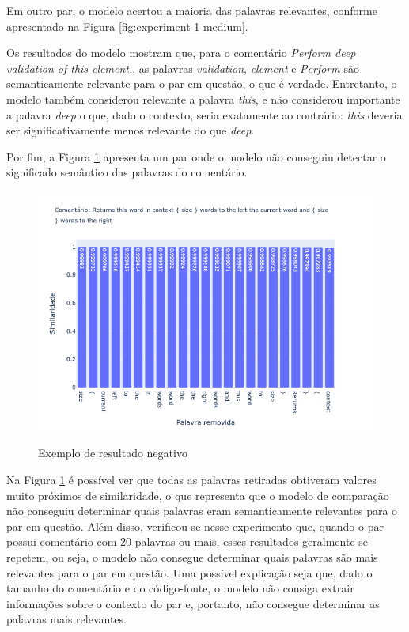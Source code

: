 Em outro par, o modelo acertou a maioria das palavras relevantes, conforme apresentado na Figura \ref{fig:experiment-1-medium}.

Os resultados do modelo mostram que, para o comentário \textit{Perform deep validation of this element.}, as palavras \textit{validation}, \textit{element} e \textit{Perform} são semanticamente relevante para o par em questão, o que é verdade. Entretanto, o modelo também considerou relevante a palavra \textit{this}, e não considerou importante a palavra \textit{deep} o que, dado o contexto, seria exatamente ao contrário: \textit{this} deveria ser significativamente menos relevante do que \textit{deep}.

Por fim, a Figura \ref{fig:experiment-1-bad} apresenta um par onde o modelo não conseguiu detectar o significado semântico das palavras do comentário.

\begin{figure}[H]
  \centering
    \caption{Exemplo de resultado negativo}
    \includegraphics[scale=0.65]{imagens/resultados/experiment-1/sample_29.png}
    \label{fig:experiment-1-bad}
\end{figure}

Na Figura \ref{fig:experiment-1-bad} é possível ver que todas as palavras retiradas obtiveram valores muito próximos de similaridade, o que representa que o modelo de comparação não conseguiu determinar quais palavras eram semanticamente relevantes para o par em questão. Além disso, verificou-se nesse experimento que, quando o par possui comentário com 20 palavras ou mais, esses resultados geralmente se repetem, ou seja, o modelo não consegue determinar quais palavras são mais relevantes para o par em questão. Uma possível explicação seja que, dado o tamanho do comentário e do código-fonte, o modelo não consiga extrair informações sobre o contexto do par e, portanto, não consegue determinar as palavras mais relevantes.

